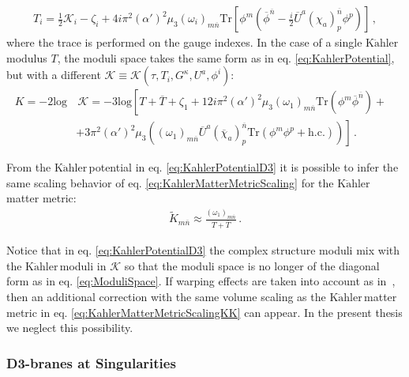 \documentclass[12pt,a4paper]{book}
\newcommand{\Kahler}{\ensuremath{\text{K}\ddot{\text{a}}\text{hler}\,}}
\begin{document}
\begin{itemize}
\begin{align}
\label{eq:D3FieldRedefinition}
T_i = \frac{1}{2} \mathcal{K}_i - \zeta_i + 4i \pi^2 \left(\alpha'\right)^2 \mu_3 \left(\omega_i\right)_{m \overline{n}} \text{Tr} \left[\phi^m \left(\overline{\phi}^{\overline{n}} - \frac{i}{2} \overline{U}^a \left(\chi_a\right)^{\overline{n}}_p \phi^p\right)\right] \,,
\end{align}
where the trace is performed on the gauge indexes. In the case of a single \Kahler modulus $T$, the moduli space takes the same form as in eq. \eqref{eq:KahlerPotential}, but with a different $\mathcal{K} \equiv \mathcal{K}(\tau,T_i,G^\kappa,U^a,\phi^i)$:
\begin{align}
\label{eq:KahlerPotentialD3}
K=-2 \text{log}&\,  \mathcal{K} = -3 \text{log} \left[T + \overline{T} + \zeta_1 + 12i \pi^2 \left(\alpha'\right)^2 \mu_3 \left(\omega_1\right)_{m \overline{n}} \text{Tr} \left(\phi^m \overline{\phi}^{\overline{n}}\right) +\right. \nonumber \\
&+\left. 3 \pi^2 \left(\alpha'\right)^2 \mu_3 \left(\left(\omega_1\right)_{m \overline{n}} \overline{U}^a \left(\overline{\chi}_a\right)^{\overline{n}}_p \text{Tr} \left(\phi^m \phi^p + \text{h.c.}\right)\right)\right]\,.&
\end{align}
\end{itemize}
From the \Kahler potential in eq. \eqref{eq:KahlerPotentialD3} it is possible to infer the same scaling behavior of eq. \eqref{eq:KahlerMatterMetricScaling} for the \Kahler matter metric:
\begin{align}
\label{eq:KahlerMatterMetricScalingKK}
\tilde{K}_{m \overline{n}} \approx \frac{\left(\omega_1\right)_{m \overline{n}}}{T + \overline{T}} \,.
\end{align}

Notice that in eq. \eqref{eq:KahlerPotentialD3} the complex structure moduli mix with the \Kahler moduli in $\mathcal{K}$ so that the moduli space is no longer of the diagonal form as in eq. \eqref{eq:ModuliSpace}. If warping effects are taken into account as in~\cite{Martucci:2014ska}, then an additional correction with the same volume scaling as the \Kahler matter metric in eq. \eqref{eq:KahlerMatterMetricScalingKK} can appear. In the present thesis we neglect this possibility.

\subsubsection{D3-branes at Singularities}
\label{sssec:D3atSingularities}
\end{document}
